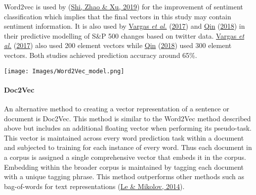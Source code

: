 \documentclass[11pt,preprint, authoryear]{elsarticle}
\let\origfigure\figure
\let\endorigfigure\endfigure
\renewenvironment{figure}[1][2] {
    \expandafter\origfigure\expandafter[H]
} {
    \endorigfigure
}
\numberwithin{equation}{section}
\numberwithin{figure}{section}
\numberwithin{table}{section}
\begin{document}
Word2vec is used by (\protect\hyperlink{ref-shi2019word2vec}{Shi, Zhao
\& Xu, 2019}) for the improvement of sentiment classification which
implies that the final vectors in this study may contain sentiment
information. It is also used by
\protect\hyperlink{ref-vargas2017deep}{Vargas \emph{et al.}}
(\protect\hyperlink{ref-vargas2017deep}{2017}) and
\protect\hyperlink{ref-qin230natural}{Qin}
(\protect\hyperlink{ref-qin230natural}{2018}) in their predictive
modelling of S\&P 500 changes based on twitter data.
\protect\hyperlink{ref-vargas2017deep}{Vargas \emph{et al.}}
(\protect\hyperlink{ref-vargas2017deep}{2017}) also used 200 element
vectors while \protect\hyperlink{ref-qin230natural}{Qin}
(\protect\hyperlink{ref-qin230natural}{2018}) used 300 element vectors.
Both studies achieved prediction accuracy around 65\%.

\begin{figure}
\centering
\texttt{[image: Images/Word2Vec\_model.png]}
\caption{Word2Vec model}
\end{figure}

\hypertarget{doc2vec}{%
\paragraph{\texorpdfstring{Doc2Vec
\label{Doc2Vec}}{Doc2Vec }}\label{doc2vec}}

An alternative method to creating a vector representation of a sentence
or document is Doc2Vec. This method is similar to the Word2Vec method
described above but includes an additional floating vector when
performing its pseudo-task. This vector is maintained across every word
prediction task within a document and subjected to training for each
instance of every word. Thus each document in a corpus is assigned a
single comprehensive vector that embeds it in the corpus. Embedding
within the broader corpus is maintained by tagging each document with a
unique tagging phrase. This method outperforms other methods such as
bag-of-words for text representations
(\protect\hyperlink{ref-le2014distributed}{Le \& Mikolov, 2014}).
\end{document}
